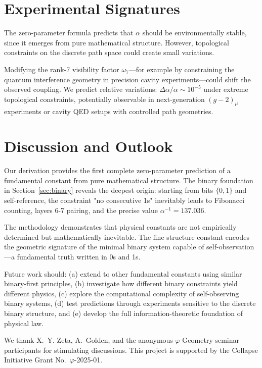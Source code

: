 \documentclass[%
 reprint,
 amsmath,amssymb,
 aps,
 prd,
 10pt,
 nofootinbib,      %
 longbibliography  %
]{revtex4-2}
\theoremstyle{definition}
\theoremstyle{remark}
\begin{document}
\section{Experimental Signatures}\label{sec:exp}

The zero-parameter formula predicts that $\alpha$ should be environmentally stable,
since it emerges from pure mathematical structure. However, topological constraints
on the discrete path space could create small variations.

Modifying the rank-7 visibility factor $\omega_7$---for example by constraining
the quantum interference geometry in precision cavity experiments---could shift
the observed coupling. We predict relative variations:
\(\Delta\alpha/\alpha \sim 10^{-5}\)
under extreme topological constraints, potentially observable in next-generation
$(g-2)_\mu$ experiments or cavity QED setups with controlled path geometries.

\section{Discussion and Outlook}\label{sec:discussion}

Our derivation provides the first complete zero-parameter prediction
of a fundamental constant from pure mathematical structure.
The binary foundation in Section~\ref{sec:binary} reveals the deepest
origin: starting from bits $\{0,1\}$ and self-reference, the constraint
"no consecutive 1s" inevitably leads to Fibonacci counting, layers 6-7
pairing, and the precise value $\alpha^{-1} = 137.036$.

The methodology demonstrates that physical constants are not empirically
determined but mathematically inevitable. The fine structure constant
encodes the geometric signature of the minimal binary system capable
of self-observation—a fundamental truth written in 0s and 1s.

Future work should:
(a) extend to other fundamental constants using similar binary-first principles,
(b) investigate how different binary constraints yield different physics,
(c) explore the computational complexity of self-observing binary systems,
(d) test predictions through experiments sensitive to the discrete binary structure,
and (e) develop the full information-theoretic foundation of physical law.

\begin{acknowledgments}
We thank
X.~Y. Zeta,
A.~Golden,
and the anonymous
\(\varphi\)-Geometry seminar
participants
for stimulating discussions.
This project is supported by the
Collapse Initiative Grant No.~$\varphi$-2025-01.
\end{acknowledgments}
\end{document}
